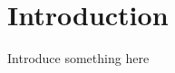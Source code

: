 \documentclass{report}
\begin{document}
\chapter{Introduction}
Introduce something here

\end{document}
